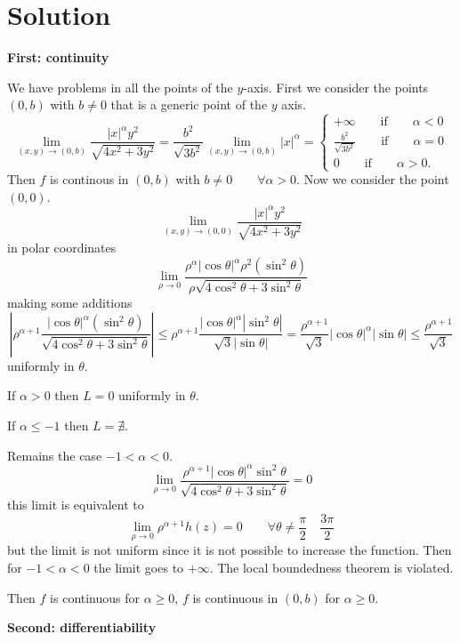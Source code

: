 \documentclass[a4paper, twoside, openany]{book}
\begin{document}
\section*{Solution}
\textbf{First: continuity} \par 
We have problems in all the points of the $y$-axis. First we consider the points $(0, b)$ with $b \neq 0$ that is a generic point of the $y$ axis.
$$\lim_{(x, y) \rightarrow (0, b)} \frac{|x|^{\alpha} y^2}{\sqrt{4 x^2 + 3 y^2}} = \frac{b^2}{\sqrt{3 b^2}} \lim_{(x,y) \rightarrow (0,b)} |x|^{\alpha} = \begin{cases}
+\infty \qquad \textrm{if} \qquad \alpha < 0 \\
\frac{b^2}{\sqrt{3 b^2}} \qquad \textrm{if} \qquad \alpha = 0\\
0 \qquad \textrm{if} \qquad \alpha > 0.
\end{cases}$$
Then $f$ is continous in $(0, b)$ with $b \neq 0 \qquad \forall \alpha > 0$.
Now we consider the point $(0, 0)$.
$$\lim_{(x, y) \rightarrow (0, 0)} \frac{|x|^{\alpha} y^2}{\sqrt{4 x^2 + 3 y^2}}$$
in polar coordinates
$$\lim_{\rho \rightarrow 0} \frac{\rho^{\alpha} |\cos \theta|^{\alpha} \rho^2 (\sin^2 \theta)}{\rho \sqrt{4 \cos^2 \theta + 3 \sin^2 \theta}}$$ 
making some additions
$$|\rho^{\alpha + 1} \frac{|\cos \theta|^{\alpha} (\sin^2 \theta)}{\sqrt{4 \cos^2 \theta + 3 \sin^2 \theta}}| \leq \rho^{\alpha + 1} \frac{|\cos \theta|^{\alpha} |\sin^2 \theta|}{\sqrt{3}|\sin \theta|} = \frac{\rho^{\alpha + 1}}{\sqrt{3}} |\cos \theta|^{\alpha} |\sin \theta| \leq \frac{\rho^{\alpha + 1}}{\sqrt{3}}$$
uniformly in $\theta$. \par  
If $\alpha > 0$ then $L = 0$ uniformly in $\theta$. \par 
If $\alpha \leq -1$ then $L = \nexists$. \par   
Remains the case $-1 < \alpha < 0$.
$$\lim_{\rho \rightarrow 0} \frac{\rho^{\alpha + 1} |\cos \theta|^{\alpha} \sin^2 \theta}{\sqrt{4 \cos^2 \theta + 3 \sin^2 \theta}} = 0$$
this limit is equivalent to
$$\lim_{\rho \rightarrow 0} \rho^{\alpha + 1} h(z) = 0 \qquad \forall \theta \neq \frac{\pi}{2} \quad \frac{3\pi}{2}$$
but the limit is not uniform since it is not possible to increase the function. Then for $-1 < \alpha < 0$ the limit goes to $+\infty$. The local boundedness theorem is violated. \par 
Then $f$ is continuous for $\alpha \geq 0$, $f$ is continuous in $(0, b)$ for $\alpha \geq 0$. \par 
\textbf{Second: differentiability} \par 
\end{document}
